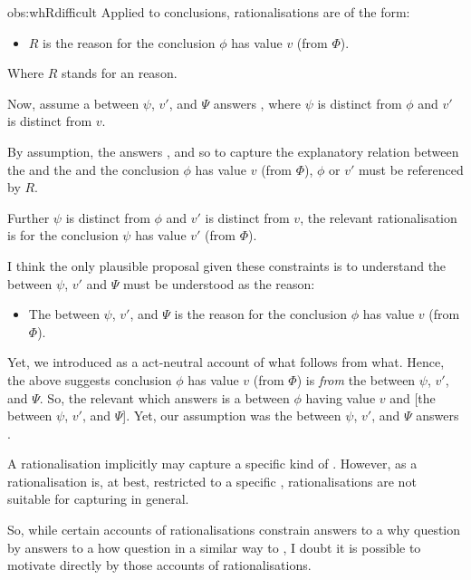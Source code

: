 \begin{note}
\begin{motivation}{obs:whRdifficult}
    Applied to conclusions, rationalisations are of the form:
    \begin{itemize}
    \item
      \(R\) is the \agents{} reason for the conclusion \(\phi\) has value \(v\) (from \(\Phi\)).
    \end{itemize}
    Where \(R\) stands for an \agents{} reason.

    Now, assume a \ros{} between \(\psi\), \(v'\), and \(\Psi\) answers \qWhy{}, where \(\psi\) is distinct from \(\phi\) and \(v'\) is distinct from \(v\).

    By assumption, the \ros{} answers \qWhy{}, and so to capture the explanatory relation between the \ros{} and the \ros{} and the \agents {} conclusion \(\phi\) has value \(v\) (from \(\Phi\)), \(\phi\) or \(v'\) must be referenced by \(R\).

    Further \(\psi\) is distinct from \(\phi\) and \(v'\) is distinct from \(v\), the relevant rationalisation is for the conclusion \(\psi\) has value \(v'\) (from \(\Phi\)).

    I think the only plausible proposal given these constraints is to understand the \ros{} between \(\psi\), \(v'\) and \(\Psi\) must be understood as the \agents{} reason:
    \begin{itemize}
    \item
      The \ros{} between \(\psi\), \(v'\), and \(\Psi\) is the \agents{} reason for the conclusion \(\phi\) has value \(v\) (from \(\Phi\)).
    \end{itemize}
    Yet, we introduced \ros{} as a act-neutral account of what follows from what.
    Hence, the above suggests conclusion \(\phi\) has value \(v\) (from \(\Phi\)) is \emph{from} the \ros{} between \(\psi\), \(v'\), and \(\Psi\).
    So, the relevant \ros{} which answers \qWhy{} is a \ros{} between \(\phi\) having value \(v\) and [the \ros{} between \(\psi\), \(v'\), and \(\Psi\)].
    Yet, our assumption was the \ros{} between \(\psi\), \(v'\), and \(\Psi\) answers \qWhy{}.
  \end{motivation}

  \noindent%
  A rationalisation implicitly may capture a specific kind of \ros{}.
  However, as a rationalisation is, at best, restricted to a specific , rationalisations are not suitable for capturing  in general.

  So, while certain accounts of rationalisations constrain answers to a why question by answers to a how question in a similar way to \issueInclusion{}, I doubt it is possible to motivate \issueInclusion{} directly by those accounts of rationalisations.


\end{note}
